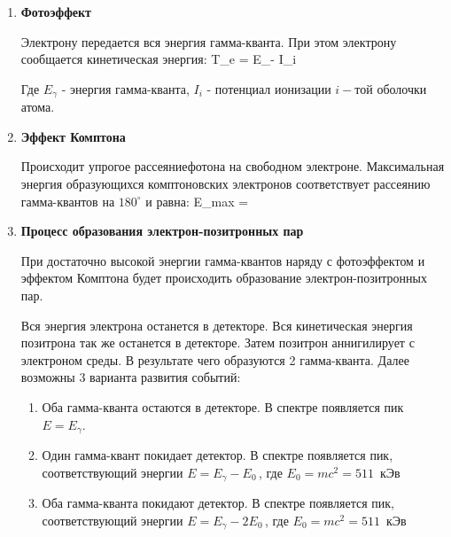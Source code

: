 \begin{enumerate}

    \item \textbf{Фотоэффект}

    Электрону передается вся энергия гамма-кванта. При этом электрону сообщается
    кинетическая энергия:
    {T_e = E_\gamma - I_i \,}

    Где $ E_\gamma $ - энергия гамма-кванта, $ I_i $ - потенциал ионизации $ i-$той
    оболочки атома.

    \item \textbf{Эффект Комптона}

    Происходит упрогое рассеяниефотона на свободном электроне. Максимальная энергия
    образующихся комптоновских электронов соответствует рассеянию гамма-квантов на
    $ 180^\circ $ и равна:
    {E_{max} = }

    \item \textbf{Процесс образования электрон-позитронных пар}

    При достаточно высокой энергии гамма-квантов наряду с фотоэффектом и эффектом Комптона
    будет происходить образование электрон-позитронных пар.

    Вся энергия электрона останется в детекторе. Вся кинетическая энергия позитрона так же
    останется в детекторе. Затем позитрон аннигилирует с электроном среды. В результате чего
    образуются 2 гамма-кванта. Далее возможны 3 варианта развития событий:

    \begin{enumerate}

        \item Оба гамма-кванта остаются в детекторе. В спектре появляется пик
        $ E = E_\gamma $.

        \item Один гамма-квант покидает детектор. В спектре появляется пик, соответствующий
        энергии $ E = E_\gamma - E_0 \, $, где $ E_0 = mc^2 = 511 \, $ кЭв

        \item Оба гамма-кванта покидают детектор. В спектре появляется пик, соответствующий
        энергии $ E = E_\gamma - 2E_0 \, $, где $ E_0 = mc^2 = 511 \, $ кЭв

    \end{enumerate}

\end{enumerate}


